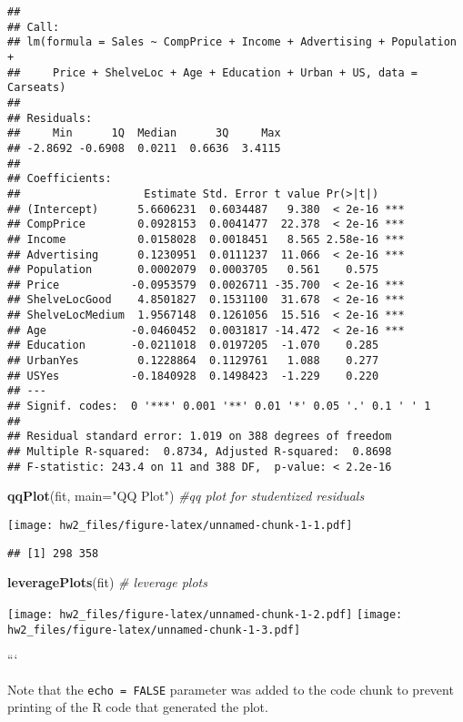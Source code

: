 \documentclass[
]{article}
\newenvironment{Shaded}{\begin{snugshade}}{\end{snugshade}}
\newcommand{\CommentTok}[1]{\textcolor[rgb]{0.56,0.35,0.01}{\textit{#1}}}
\newcommand{\DataTypeTok}[1]{\textcolor[rgb]{0.13,0.29,0.53}{#1}}
\newcommand{\KeywordTok}[1]{\textcolor[rgb]{0.13,0.29,0.53}{\textbf{#1}}}
\newcommand{\NormalTok}[1]{#1}
\newcommand{\StringTok}[1]{\textcolor[rgb]{0.31,0.60,0.02}{#1}}
\begin{document}
\begin{verbatim}
## 
## Call:
## lm(formula = Sales ~ CompPrice + Income + Advertising + Population + 
##     Price + ShelveLoc + Age + Education + Urban + US, data = Carseats)
## 
## Residuals:
##     Min      1Q  Median      3Q     Max 
## -2.8692 -0.6908  0.0211  0.6636  3.4115 
## 
## Coefficients:
##                   Estimate Std. Error t value Pr(>|t|)    
## (Intercept)      5.6606231  0.6034487   9.380  < 2e-16 ***
## CompPrice        0.0928153  0.0041477  22.378  < 2e-16 ***
## Income           0.0158028  0.0018451   8.565 2.58e-16 ***
## Advertising      0.1230951  0.0111237  11.066  < 2e-16 ***
## Population       0.0002079  0.0003705   0.561    0.575    
## Price           -0.0953579  0.0026711 -35.700  < 2e-16 ***
## ShelveLocGood    4.8501827  0.1531100  31.678  < 2e-16 ***
## ShelveLocMedium  1.9567148  0.1261056  15.516  < 2e-16 ***
## Age             -0.0460452  0.0031817 -14.472  < 2e-16 ***
## Education       -0.0211018  0.0197205  -1.070    0.285    
## UrbanYes         0.1228864  0.1129761   1.088    0.277    
## USYes           -0.1840928  0.1498423  -1.229    0.220    
## ---
## Signif. codes:  0 '***' 0.001 '**' 0.01 '*' 0.05 '.' 0.1 ' ' 1
## 
## Residual standard error: 1.019 on 388 degrees of freedom
## Multiple R-squared:  0.8734, Adjusted R-squared:  0.8698 
## F-statistic: 243.4 on 11 and 388 DF,  p-value: < 2.2e-16
\end{verbatim}

\begin{Shaded}
\begin{Highlighting}[]
\KeywordTok{qqPlot}\NormalTok{(fit, }\DataTypeTok{main=}\StringTok{"QQ Plot"}\NormalTok{) }\CommentTok{#qq plot for studentized residuals}
\end{Highlighting}
\end{Shaded}

\texttt{[image: hw2\_files/figure-latex/unnamed-chunk-1-1.pdf]}

\begin{verbatim}
## [1] 298 358
\end{verbatim}

\begin{Shaded}
\begin{Highlighting}[]
\KeywordTok{leveragePlots}\NormalTok{(fit) }\CommentTok{# leverage plots}
\end{Highlighting}
\end{Shaded}

\texttt{[image: hw2\_files/figure-latex/unnamed-chunk-1-2.pdf]}
\texttt{[image: hw2\_files/figure-latex/unnamed-chunk-1-3.pdf]}

```

Note that the \texttt{echo\ =\ FALSE} parameter was added to the code
chunk to prevent printing of the R code that generated the plot.
\end{document}
